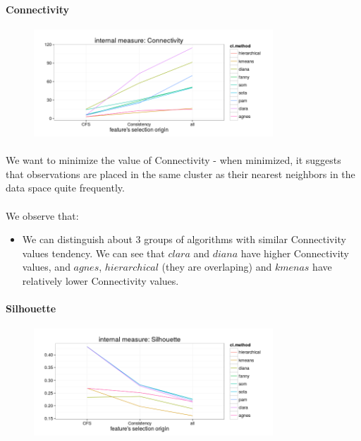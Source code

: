 \documentclass[10pt]{article}\usepackage[]{graphicx}\usepackage[]{color}
\begin{document}
\paragraph{Connectivity} 
\begin{figure}[h!]
\centering
\includegraphics[width=0.8\textwidth]{Plots2/comp1-connectivity.png}
\end{figure}
\paragraph{} 
We want to minimize the value of Connectivity - when minimized, it suggests 
that observations are placed in the same cluster as their nearest
neighbors in the data space quite frequently.
\paragraph{}
We observe that:
\begin{itemize}
\item We can distinguish about 3 groups of algorithms with similar Connectivity values tendency. We can see that $clara$ and $diana$ have higher Connectivity values, and 
$agnes$, $hierarchical$ (they are overlaping) and $kmenas$ have relatively lower Connectivity values.
\end{itemize}

\clearpage
\paragraph{Silhouette} 
\begin{figure}[h!]
\centering
\includegraphics[width=0.8\textwidth]{Plots2/comp1-silhouette.png}
\end{figure}
\end{document}
